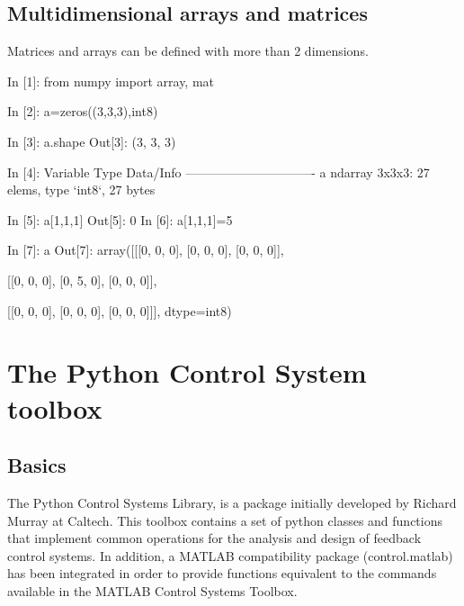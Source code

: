 \section{Multidimensional arrays and matrices}
Matrices and arrays can be defined with more than 2 dimensions.

\begin{code}
In [1]: from numpy import array, mat

In [2]: a=zeros((3,3,3),int8)

In [3]: a.shape
Out[3]: (3, 3, 3)

In [4]: %
Variable   Type       Data/Info
-------------------------------
a          ndarray    3x3x3: 27 elems, type `int8`, 27 bytes

In [5]: a[1,1,1]
Out[5]: 0
In [6]: a[1,1,1]=5

In [7]: a
Out[7]: 
array([[[0, 0, 0],
        [0, 0, 0],
        [0, 0, 0]],

       [[0, 0, 0],
        [0, 5, 0],
        [0, 0, 0]],

       [[0, 0, 0],
        [0, 0, 0],
        [0, 0, 0]]], dtype=int8)

\end{code}

% 
% 
% 
% 
% 
% 

\newpage

\chapter{The Python Control System toolbox}
\section{Basics}

The Python Control Systems Library, is a package initially developed by 
Richard Murray at Caltech. This toolbox  contains a set of python classes 
and functions that implement common operations for the analysis and design of 
feedback control systems. 
In addition, a MATLAB compatibility package (control.matlab) has been 
integrated in order to provide functions equivalent to the commands available 
in the MATLAB Control Systems Toolbox.

